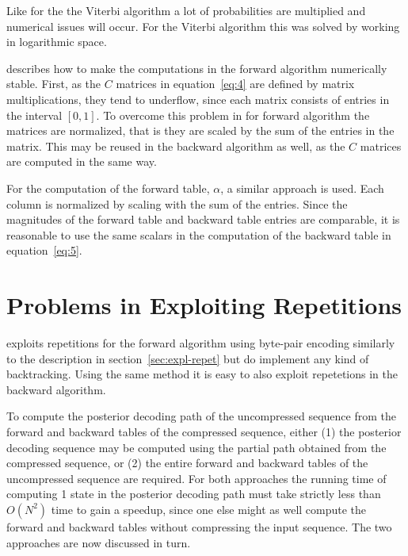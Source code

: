 Like for the the Viterbi algorithm a lot of probabilities are multiplied and
numerical issues will occur. For the Viterbi algorithm this was solved by
working in logarithmic space.

\citet{sand2013ziphmmlib} describes how to make the computations in the forward
algorithm numerically stable. First, as the $C$ matrices in
equation~\eqref{eq:4} are defined by matrix multiplications, they tend to
underflow, since each matrix consists of entries in the interval $[0, 1]$. To
overcome this problem in for forward algorithm the matrices are normalized,
that is they are scaled by the sum of the entries in the matrix. This may be
reused in the backward algorithm as well, as the $C$ matrices are computed in
the same way.

For the computation of the forward table, $\alpha$, a similar approach is
used. Each column is normalized by scaling with the sum of the entries. Since
the magnitudes of the forward table and backward table entries are comparable,
it is reasonable to use the same scalars in the computation of the backward
table in equation~\eqref{eq:5}. 



\section{Problems in Exploiting Repetitions}
\label{sec:probl-expl-repet}

\citet{sand2013ziphmmlib} exploits repetitions for the forward algorithm using
byte-pair encoding similarly to the description in
section~\ref{sec:expl-repet} but do implement any kind of backtracking. Using
the same method it is easy to also exploit repetetions in the backward
algorithm.

To compute the posterior decoding path of the uncompressed sequence from the
forward and backward tables of the compressed sequence, either (1) the
posterior decoding sequence may be computed using the partial path obtained
from the compressed sequence, or (2) the entire forward and backward tables of
the uncompressed sequence are required. For both approaches the running time of
computing 1 state in the posterior decoding path must take strictly less than
$O(N^2)$ time to gain a speedup, since one else might as well compute the
forward and backward tables without compressing the input sequence. The two
approaches are now discussed in turn.

